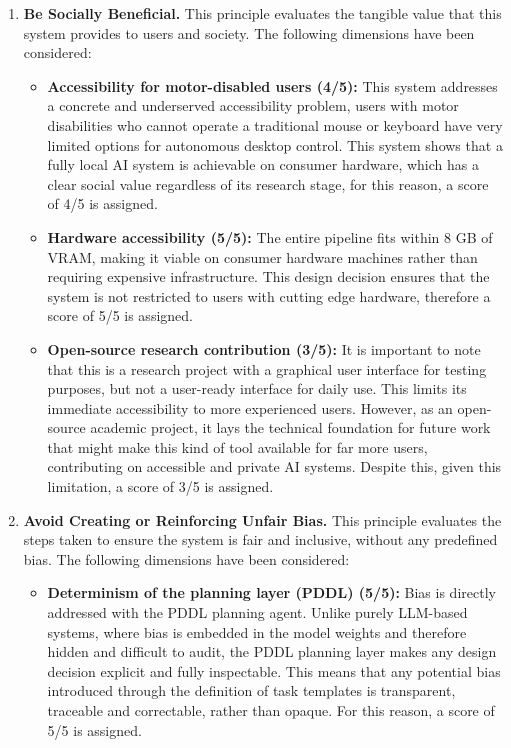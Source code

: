 \begin{enumerate}

    \item \textbf{Be Socially Beneficial.} This principle evaluates the tangible
    value that this system provides to users and society. The following dimensions
    have been considered:

    \begin{itemize}
        \item \textbf{Accessibility for motor-disabled users (4/5):} This system
        addresses a concrete and underserved accessibility problem, users with motor
        disabilities who cannot operate a traditional mouse or keyboard have very
        limited options for autonomous desktop control. This system shows that a
        fully local AI system is achievable on consumer hardware, which has a clear
        social value regardless of its research stage, for this reason, a score of
        4/5 is assigned.

        \item \textbf{Hardware accessibility (5/5):} The entire pipeline fits within
        8 GB of VRAM, making it viable on consumer hardware machines rather than
        requiring expensive infrastructure. This design decision ensures that the
        system is not restricted to users with cutting edge hardware, therefore a
        score of 5/5 is assigned.

        \item \textbf{Open-source research contribution (3/5):} It is important to
        note that this is a research project with a graphical user interface for
        testing purposes, but not a user-ready interface for daily use. This limits
        its immediate accessibility to more experienced users.
        However, as an open-source academic project, it lays the technical foundation
        for future work that might make this kind of tool available for far more users,
        contributing on accessible and private AI systems. Despite this, given this
        limitation, a score of 3/5 is assigned.
    \end{itemize}

    \item \textbf{Avoid Creating or Reinforcing Unfair Bias.} This principle
    evaluates the steps taken to ensure the system is fair and inclusive, without
    any predefined bias. The following dimensions have been considered:

    \begin{itemize}
        \item \textbf{Determinism of the planning layer (PDDL) (5/5):} Bias is directly
        addressed with the PDDL planning agent. Unlike purely LLM-based systems, where
        bias is embedded in the model weights and therefore hidden and difficult to audit,
        the PDDL planning layer makes any design decision explicit and fully inspectable.
        This means that any potential bias introduced through the definition of task
        templates is transparent, traceable and correctable, rather than opaque. For this
        reason, a score of 5/5 is assigned.


\end{itemize}
\end{enumerate}
